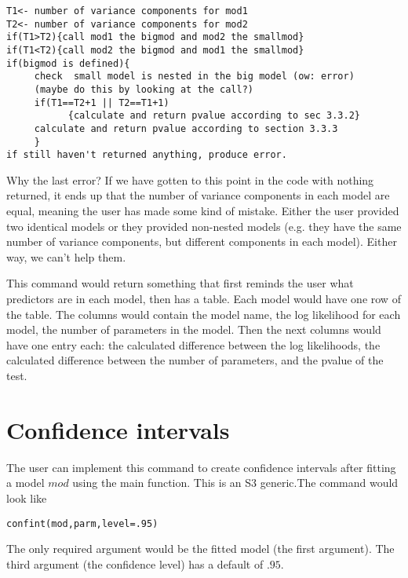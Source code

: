\documentclass{article}
\begin{document}
\begin{verbatim}
T1<- number of variance components for mod1
T2<- number of variance components for mod2
if(T1>T2){call mod1 the bigmod and mod2 the smallmod}
if(T1<T2){call mod2 the bigmod and mod1 the smallmod}
if(bigmod is defined){
     check  small model is nested in the big model (ow: error)
     (maybe do this by looking at the call?)
     if(T1==T2+1 || T2==T1+1) 
           {calculate and return pvalue according to sec 3.3.2}     
     calculate and return pvalue according to section 3.3.3
     }
if still haven't returned anything, produce error.     
\end{verbatim}	

Why the last error? If we have gotten to this point in the code with nothing returned, it ends up that the number of variance components in each model are equal, meaning the user has made some kind of mistake. Either the user provided two identical models or they provided non-nested models (e.g. they have the same number of variance components, but different components in each model). Either way, we can't help them.





This command would return something that first reminds the user what predictors are in each model, then has a table. Each model would have one row of the table. The columns would contain the model name,  the log likelihood for each model, the number of parameters in the model. Then the next columns would have one entry each: the calculated difference between the log likelihoods, the calculated difference between the number of parameters, and the pvalue of the test. 



\section{Confidence intervals}
The user can implement this command to create confidence intervals after  fitting a model $mod$ using the main function.  This is an S3 generic.The command would look like
\begin{verbatim}
confint(mod,parm,level=.95)
\end{verbatim}
The only required argument would be the fitted model (the first argument). The third argument (the confidence level) has a default of $.95$.
\end{document}
